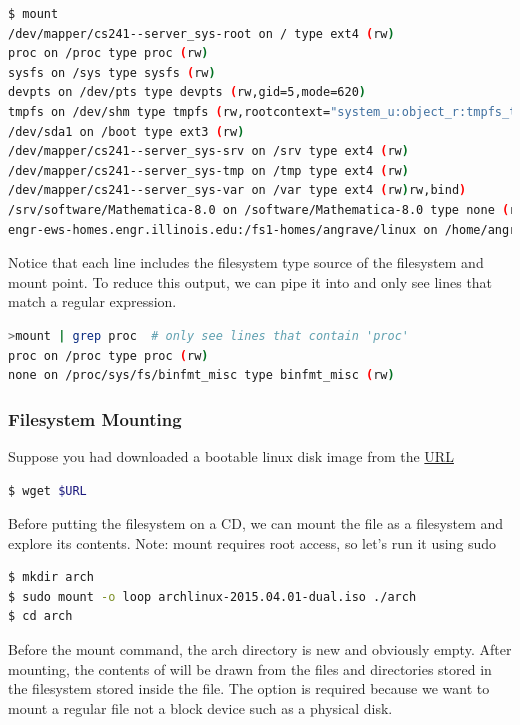 \begin{lstlisting}[language=bash]
$ mount
/dev/mapper/cs241--server_sys-root on / type ext4 (rw)
proc on /proc type proc (rw)
sysfs on /sys type sysfs (rw)
devpts on /dev/pts type devpts (rw,gid=5,mode=620)
tmpfs on /dev/shm type tmpfs (rw,rootcontext="system_u:object_r:tmpfs_t:s0")
/dev/sda1 on /boot type ext3 (rw)
/dev/mapper/cs241--server_sys-srv on /srv type ext4 (rw)
/dev/mapper/cs241--server_sys-tmp on /tmp type ext4 (rw)
/dev/mapper/cs241--server_sys-var on /var type ext4 (rw)rw,bind)
/srv/software/Mathematica-8.0 on /software/Mathematica-8.0 type none (rw,bind)
engr-ews-homes.engr.illinois.edu:/fs1-homes/angrave/linux on /home/angrave type nfs (rw,soft,intr,tcp,noacl,acregmin=30,vers=3,sec=sys,sloppy,addr=128.174.252.102)
\end{lstlisting}

Notice that each line includes the filesystem type source of the filesystem and mount point.
To reduce this output, we can pipe it into  and only see lines that match a regular expression.

\begin{lstlisting}[language=bash]
>mount | grep proc  # only see lines that contain 'proc'
proc on /proc type proc (rw)
none on /proc/sys/fs/binfmt_misc type binfmt_misc (rw)
\end{lstlisting}

\subsubsection{Filesystem Mounting}

Suppose you had downloaded a bootable linux disk image from the \href{http://cosmos.cites.illinois.edu/pub/archlinux/iso/2015.04.01/archlinux-2015.04.01-dual.iso}{URL}

\begin{lstlisting}[language=bash]
$ wget $URL
\end{lstlisting}

Before putting the filesystem on a CD, we can mount the file as a filesystem and explore its contents.
Note: mount requires root access, so let's run it using sudo

\begin{lstlisting}[language=bash]
$ mkdir arch
$ sudo mount -o loop archlinux-2015.04.01-dual.iso ./arch
$ cd arch
\end{lstlisting}

Before the mount command, the arch directory is new and obviously empty.
After mounting, the contents of  will be drawn from the files and directories stored in the filesystem stored inside the  file.
The  option is required because we want to mount a regular file not a block device such as a physical disk.

